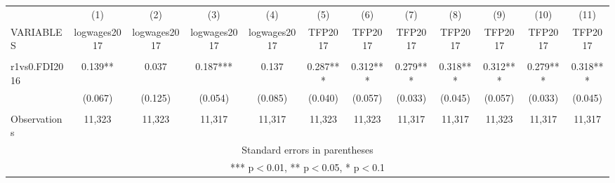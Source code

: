 \documentclass[]{article}
\begin{document}
\begin{tabular}{lccccccccccc} \hline
 & (1) & (2) & (3) & (4) & (5) & (6) & (7) & (8) & (9) & (10) & (11) \\
VARIABLES & logwages2017 & logwages2017 & logwages2017 & logwages2017 & TFP2017 & TFP2017 & TFP2017 & TFP2017 & TFP2017 & TFP2017 & TFP2017 \\ \hline
 &  &  &  &  &  &  &  &  &  &  &  \\
r1vs0.FDI2016 & 0.139** & 0.037 & 0.187*** & 0.137 & 0.287*** & 0.312*** & 0.279*** & 0.318*** & 0.312*** & 0.279*** & 0.318*** \\
 & (0.067) & (0.125) & (0.054) & (0.085) & (0.040) & (0.057) & (0.033) & (0.045) & (0.057) & (0.033) & (0.045) \\
 &  &  &  &  &  &  &  &  &  &  &  \\
 Observations & 11,323 & 11,323 & 11,317 & 11,317 & 11,323 & 11,323 & 11,317 & 11,317 & 11,323 & 11,317 & 11,317 \\ \hline
\multicolumn{12}{c}{ Standard errors in parentheses} \\
\multicolumn{12}{c}{ *** p$<$0.01, ** p$<$0.05, * p$<$0.1} \\
\end{tabular}
\end{document}

